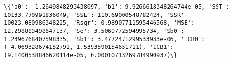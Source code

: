 \documentclass[11pt]{article}
\begin{document}
    \begin{Verbatim}[commandchars=\\\{\}]
\{'b0': -1.2649848293438097, 'b1': 9.9266618348264744e-05, 'SST': 10133.770991836049, 'SSE': 110.69000548782424, 'SSR': 10023.080986348225, 'Rsqr': 0.98907711595446568, 'MSE': 12.298889498647137, 'Se': 3.5069772594995734, 'Sb0': 1.2396768407598335, 'Sb1': 3.4772471299533933e-06, 'ICB0': (-4.069328674152791, 1.5393590154651711), 'ICB1': (9.1400538846620114e-05, 0.00010713269784990937)\}

    \end{Verbatim}

    \begin{center}
    \end{center}
    { \hspace*{\fill} \\}
    
\end{document}
